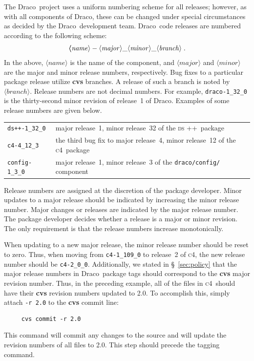 \documentclass[11pt]{nmemo}
\newcommand{\draco}{{\normalfont\normalsize\sffamily Draco}}
\newcommand{\cfour}{{\normalfont\normalsize\scshape c\small 4}}
\newcommand{\dsxx}{{\normalfont\normalsize\scshape ds\raisebox{.2ex}
  {\scriptsize ++}}}
\begin{document}
The \draco\ project uses a uniform numbering scheme for all releases;
however, as with all components of \draco, these can be changed under
special circumstances as decided by the \draco\ development team.
\draco\ code releases are numbered according to the following scheme:
\begin{equation}
  \boldsymbol
  \langle\mathit{name}\rangle-
  \langle\mathit{major}\rangle\_
  \langle\mathit{minor}\rangle\_
  \langle\mathit{branch}\rangle\; .
  \notag
\end{equation}
In the above, $\langle\mathit{name}\rangle$ is the name of the
component, and $\langle\mathit{major}\rangle$ and
$\langle\mathit{minor}\rangle$ are the major and minor release
numbers, respectively. Bug fixes to a particular package release utilize
{\bf cvs} branches.  A release of such a branch is noted by
$\langle\mathit{branch}\rangle$.  Release numbers are not decimal
numbers.  For example, \texttt{draco-1\_32\_0} is the thirty-second
minor revision of release~1 of \draco.  Examples of some release
numbers are given below.
\begin{center}
  \begin{tabular}{ll}
    \texttt{ds++-1\_32\_0} & major release~1, minor release~32 of the
    \dsxx\ package \\
    \texttt{c4-4\_12\_3} & the third bug fix to major release~4, minor
    release~12 of the \cfour\ package \\
    \texttt{config-1\_3\_0} & major release~1, minor release~3 of the
    \texttt{draco/config/} component\\
  \end{tabular}
\end{center}

Release numbers are assigned at the discretion of the package
developer.  Minor updates to a major release should be indicated by
increasing the minor release number.  Major changes or releases are
indicated by the major release number.  The package developer decides
whether a release is a major or minor revision.  The only requirement
is that the release numbers increase monotonically. 

When updating to a new major release, the minor release number should
be reset to zero.  Thus, when moving from \texttt{c4-1\_109\_0} to
release~2 of \cfour, the new release number should be
\texttt{c4-2\_0\_0}.  Additionally, we stated in \S~\ref{sec:policy}
that the major release numbers in \draco\ package tags should
correspond to the {\bf cvs} major revision number.  Thus, in the
preceding example, all of the files in \cfour\ should have their {\bf
  cvs} revision numbers updated to 2.0.  To accomplish this, simply
attach \texttt{-r 2.0} to the {\bf cvs} commit line:
\begin{verbatim}
     cvs commit -r 2.0
\end{verbatim}
This command will commit any changes to the source and will update 
the revision numbers of all files to 2.0.  This step should precede
the tagging command.
\end{document}
